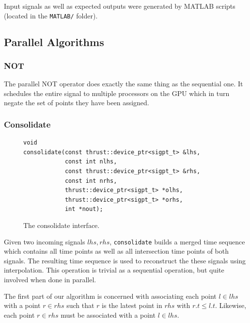 \documentclass[a4paper,10pt]{article}
\begin{document}
Input signals as well as expected outputs were generated by MATLAB scripts (located
in the \verb|MATLAB/| folder).


\subsection{Parallel Algorithms}

\subsubsection{NOT}

The parallel NOT operator does exactly the same thing as the sequential one. It
schedules the entire signal to multiple processors on the GPU which in turn negate
the set of points they have been assigned.

\subsubsection{Consolidate}
\label{sec:consolidate}

\begin{figure}[H]
\begin{lstlisting}
void
consolidate(const thrust::device_ptr<sigpt_t> &lhs,
            const int nlhs,
            const thrust::device_ptr<sigpt_t> &rhs,
            const int nrhs,
            thrust::device_ptr<sigpt_t> *olhs,
            thrust::device_ptr<sigpt_t> *orhs,
            int *nout);
\end{lstlisting}
\caption{
\label{fig:parallel_consolidate}
The consolidate interface.}
\end{figure}

Given two incoming signals $lhs, rhs$, \lstinline|consolidate| builds a
merged time sequence which contains all time points as well as all intersection
time points of both signals. The resulting time sequence is used to reconstruct
the these signals using interpolation. This operation is trivial as a sequential
operation, but quite involved when done in parallel.

The first part of our algorithm is concerned with associating each point $l \in lhs$
with a point $r \in rhs$ such that $r$ is the latest point in $rhs$ with $r.t \leq l.t$. Likewise, each point $r \in rhs$ must be associated with a point $l \in lhs$.
\end{document}
